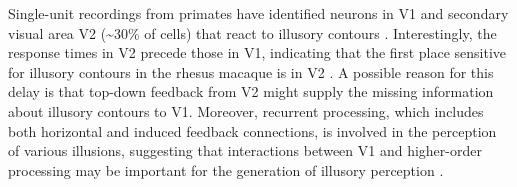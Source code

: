 \documentclass[12pt]{article}
\begin{document}
Single-unit recordings from primates have identified neurons in V1 and secondary visual area V2 (\textasciitilde30\% of cells) that react to illusory contours \autocite{vonderheydtMechanismsContourPerception1989}. Interestingly, the response times in V2 precede those in V1, indicating that the first place sensitive for illusory contours in the rhesus macaque is in V2 \autocite{leeDynamicsSubjectiveContour2001}. A possible reason for this delay is that top-down feedback from V2 might supply the missing information about illusory contours to V1. Moreover, recurrent processing, which includes both horizontal and induced feedback connections, is involved in the perception of various illusions, suggesting that interactions between V1 and higher-order processing may be important for the generation of illusory perception \autocite{deweerdCuedependentDeficitsGrating1996,mendolaRepresentationIllusoryReal1999,panEquivalentRepresentationReal2012,roelfsemaCORTICALALGORITHMSPERCEPTUAL2006}.
\end{document}
